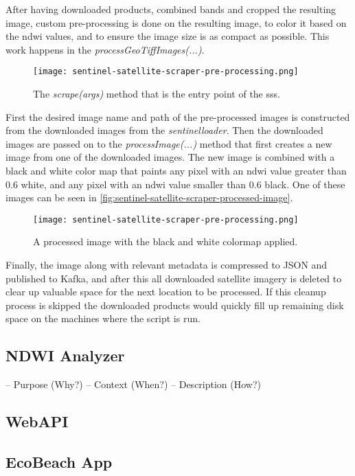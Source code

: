 After having downloaded products, combined bands and cropped the resulting image, custom pre-processing is done on the resulting image, to color it based on the \acrshort{ndwi} values, and to ensure the image size is as compact as possible. This work happens in the \emph{processGeoTiffImages(...)}.

\begin{figure}[h!]
    \centering
    \texttt{[image: sentinel-satellite-scraper-pre-processing.png]}
    \caption{The \emph{scrape(args)} method that is the entry point of the \acrshort{sss}.}
    \label{fig:sentinel-satellite-scraper-pre-processing}
\end{figure}

First the desired image name and path of the pre-processed images is constructed from the downloaded images from the \emph{sentinelloader}. Then the downloaded images are passed on to the \emph{processImage(...)} method that first creates a new image from one of the downloaded images. The new image is combined with a black and white color map that paints any pixel with an \acrshort{ndwi} value greater than 0.6 white, and any pixel with an \acrshort{ndwi} value smaller than 0.6 black. One of these images can be seen in \autoref{fig:sentinel-satellite-scraper-processed-image}.

\begin{figure}[h!]
    \centering
    \texttt{[image: sentinel-satellite-scraper-pre-processing.png]}
    \caption{A processed image with the black and white colormap applied.}
    \label{fig:sentinel-satellite-scraper-processed-image}
\end{figure}

Finally, the image along with relevant metadata is compressed to JSON and published to Kafka, and after this all downloaded satellite imagery is deleted to clear up valuable space for the next location to be processed. If this cleanup process is skipped the downloaded products would quickly fill up remaining disk space on the machines where the script is run.




\subsection{NDWI Analyzer}\label{subsec:ndwi-analyzer}

– Purpose (Why?)
– Context (When?)
– Description (How?)

\subsection{WebAPI}

\subsection{EcoBeach App}





